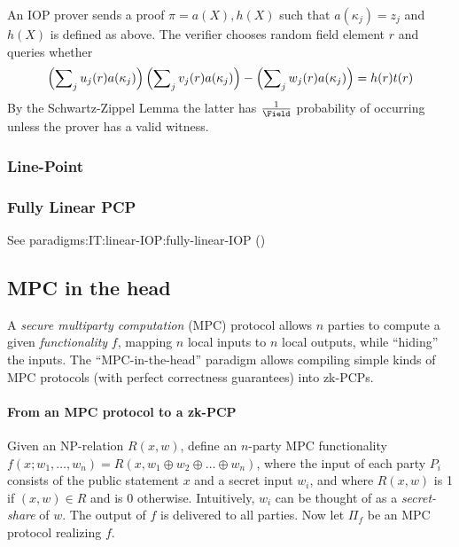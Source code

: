 An IOP prover sends a proof $\pi = a(X), h(X)$ such that $a(\kappa_j) = z_j$ and $h(X)$ is defined as above.
The verifier chooses random field element $r$ and queries whether
\[ \left( \sum\nolimits_{j}  u_j(r) a(\kappa_j) \right)  \left( \sum\nolimits_{j}  v_j(r) a(\kappa_j)  \right) -  \left( \sum\nolimits_{j}  w_j(r) a(\kappa_j)  \right)   = h(r) t(r) \]
By the Schwartz-Zippel Lemma the latter has $\frac{1}{\Field}$ probability of occurring unless the prover has a valid witness. 


\subsubsection{Line-Point}
\label{paradigms:IT:linear-PCP:line-point}

\WANTED[]


\subsubsection{Fully Linear PCP}
\label{paradigms:IT:linear-PCP:fully-linear}

See \refname{paradigms:IT:linear-IOP:fully-linear-IOP} ()




\subsection{MPC in the head}
\label{paradigms:IT:MPC-in-the-head}

A {\em secure multiparty computation} (MPC) protocol \cite{2020:SMPC} allows $n$ parties to compute a given {\em functionality} $f$, mapping $n$ local inputs to $n$ local outputs, while ``hiding'' the inputs.
The ``MPC-in-the-head'' paradigm \cite{2009:IKOS:ZKPs-from-SMPC} allows compiling simple kinds of MPC protocols (with perfect correctness guarantees) into zk-PCPs.
\loosen




\paragraph{From an MPC protocol to a zk-PCP}
Given an NP-relation $R(x,w)$, define an $n$-party MPC functionality $f(x;w_1,\ldots,w_n)=R(x,w_1\oplus w_2\oplus\ldots\oplus w_n)$, where the input of each party $P_i$ consists of the public statement $x$ and a secret input $w_i$, and where $R(x,w)$ is 1 if $(x,w)\in R$ and is 0 otherwise. Intuitively, $w_i$ can be thought of as a {\em secret-share} of $w$. The output of $f$ is delivered to all parties.
Now let $\Pi_f$ be an MPC protocol realizing $f$. 

